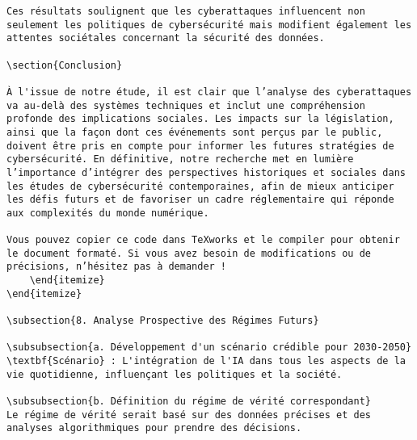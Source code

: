 \documentclass{article}
\begin{document}
\begin{verbatim}
Ces résultats soulignent que les cyberattaques influencent non seulement les politiques de cybersécurité mais modifient également les attentes sociétales concernant la sécurité des données.

\section{Conclusion}

À l'issue de notre étude, il est clair que l’analyse des cyberattaques va au-delà des systèmes techniques et inclut une compréhension profonde des implications sociales. Les impacts sur la législation, ainsi que la façon dont ces événements sont perçus par le public, doivent être pris en compte pour informer les futures stratégies de cybersécurité. En définitive, notre recherche met en lumière l’importance d’intégrer des perspectives historiques et sociales dans les études de cybersécurité contemporaines, afin de mieux anticiper les défis futurs et de favoriser un cadre réglementaire qui réponde aux complexités du monde numérique.

Vous pouvez copier ce code dans TeXworks et le compiler pour obtenir le document formaté. Si vous avez besoin de modifications ou de précisions, n’hésitez pas à demander !
    \end{itemize}
\end{itemize}

\subsection{8. Analyse Prospective des Régimes Futurs}

\subsubsection{a. Développement d'un scénario crédible pour 2030-2050}
\textbf{Scénario} : L'intégration de l'IA dans tous les aspects de la vie quotidienne, influençant les politiques et la société.

\subsubsection{b. Définition du régime de vérité correspondant}
Le régime de vérité serait basé sur des données précises et des analyses algorithmiques pour prendre des décisions.


\end{verbatim}
\end{document}
